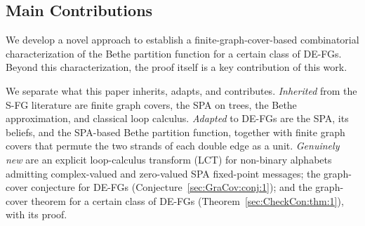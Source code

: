 \documentclass[journal]{IEEEtran}
\newcommand{\add}[1]{{\color{black}#1}}
\begin{document}
\subsection{Main Contributions}

We develop a novel approach to establish a finite-graph-cover-based
combinatorial characterization of the Bethe partition function for a certain
class of DE-FGs. Beyond this characterization, the proof itself is a key
contribution of this work.

\add{We separate what this paper inherits, adapts, and
  contributes. \emph{Inherited} from the S-FG literature are finite graph
  covers, the SPA on trees, the Bethe approximation, and classical loop
  calculus. \emph{Adapted} to DE-FGs are the SPA, its beliefs, and the
  SPA-based Bethe partition function, together with finite graph covers that
  permute the two strands of each double edge as a unit. \emph{Genuinely new}
  are an explicit loop-calculus transform (LCT) for non-binary alphabets
  admitting complex-valued and zero-valued SPA fixed-point messages; the
  graph-cover conjecture for DE-FGs (Conjecture~\ref{sec:GraCov:conj:1}); and
  the graph-cover theorem for a certain class of DE-FGs
  (Theorem~\ref{sec:CheckCon:thm:1}), with its proof.}
\end{document}
